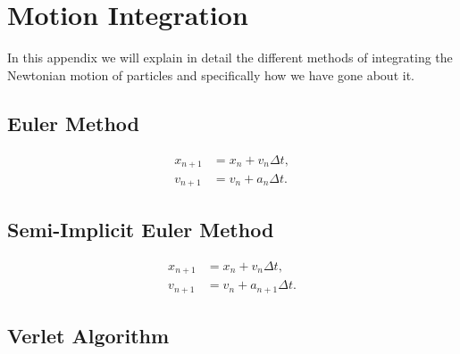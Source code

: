 
\chapter{ Motion Integration }


In this appendix we will explain in detail the different methods of integrating the Newtonian motion of particles and specifically how we have gone about it.

\section{ Euler Method }

\begin{align}
    x_{n+1} &= x_{n} + v_{n} \Delta t,\\
    v_{n+1} &= v_{n} + a_{n} \Delta t.
\end{align}


\section{ Semi-Implicit Euler Method }

\begin{align}
    x_{n+1} &= x_{n} + v_{n} \Delta t,\\
    v_{n+1} &= v_{n} + a_{n+1} \Delta t.
\end{align}



\section{ Verlet Algorithm }

